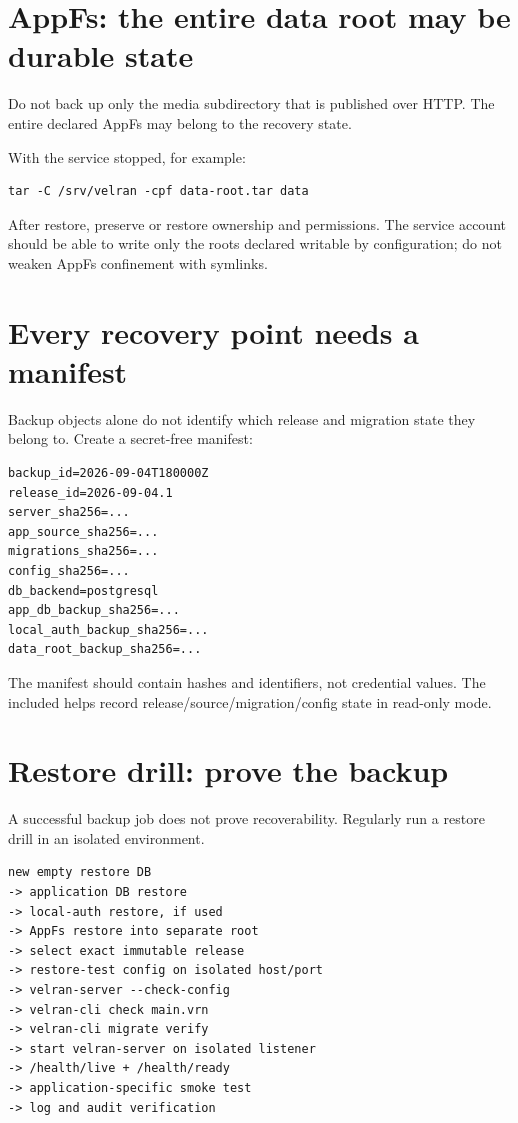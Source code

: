 \section{AppFs: the entire data root may be durable state}

Do not back up only the media subdirectory that is published over HTTP. The entire declared AppFs  may belong to the recovery state.

With the service stopped, for example:

\begin{lstlisting}
tar -C /srv/velran -cpf data-root.tar data
\end{lstlisting}

After restore, preserve or restore ownership and permissions. The service account should be able to write only the roots declared writable by configuration; do not weaken AppFs confinement with symlinks.

\section{Every recovery point needs a manifest}

Backup objects alone do not identify which release and migration state they belong to. Create a secret-free manifest:

\begin{lstlisting}
backup_id=2026-09-04T180000Z
release_id=2026-09-04.1
server_sha256=...
app_source_sha256=...
migrations_sha256=...
config_sha256=...
db_backend=postgresql
app_db_backup_sha256=...
local_auth_backup_sha256=...
data_root_backup_sha256=...
\end{lstlisting}

The manifest should contain hashes and identifiers, not credential values. The included  helps record release/source/migration/config state in read-only mode.

\section{Restore drill: prove the backup}

A successful backup job does not prove recoverability. Regularly run a restore drill in an isolated environment.

\begin{lstlisting}
new empty restore DB
-> application DB restore
-> local-auth restore, if used
-> AppFs restore into separate root
-> select exact immutable release
-> restore-test config on isolated host/port
-> velran-server --check-config
-> velran-cli check main.vrn
-> velran-cli migrate verify
-> start velran-server on isolated listener
-> /health/live + /health/ready
-> application-specific smoke test
-> log and audit verification
\end{lstlisting}

